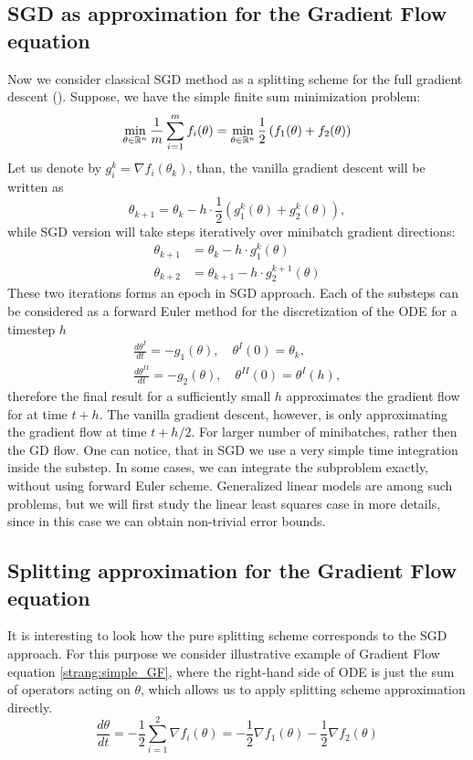 \documentclass{article} %
\begin{document}
\subsection{SGD as approximation for the Gradient Flow equation}
Now we consider classical SGD method as a splitting scheme for the full gradient descent (\cite{cauchy1847methode}). Suppose, we have the simple finite sum minimization problem:
$$
\min_{\theta \in {\mathbb{R}}^n} \dfrac{1}{m}\sum\limits_{i=1}^m f_i(\theta) = \min_{\theta \in {\mathbb{R}}^n} \frac{1}{2} \left( f_1(\theta) + f_2(\theta)\right)
$$
Let us denote by $g_i^k = \nabla f_i(\theta_k)$, than, the vanilla gradient descent will be written as
$$
\theta_{k+1} = \theta_k - h\cdot\frac{1}{2} \left( g^k_1(\theta) + g^k_2(\theta)\right),
$$
while SGD version will take steps iteratively over minibatch gradient directions:
\begin{align*}\label{strang:sgd2}
\theta_{k+1} &= \theta_k - h\cdot g^k_1(\theta) \\
\theta_{k+2} &= \theta_{k+1} - h\cdot  g^{k+1}_2(\theta)
\end{align*}
These two iterations forms an epoch in SGD approach. Each of the substeps can be considered as a forward Euler method for the discretization of the ODE for a timestep $h$
\begin{align*}
    \frac{d \theta^I}{d t} = -g_1(\theta), \quad \theta^I(0) = \theta_{k},\\
    \frac{d \theta^{II}}{d t} = -g_2(\theta), \quad \theta^{II}(0) = \theta^{I}(h),
\end{align*}
therefore the final result for a sufficiently small $h$ approximates the gradient flow for at time $t + h$. The vanilla gradient descent, however, is only approximating the gradient flow at time $t + h/2$. For larger number of minibatches, rather then the GD flow. One can notice, that in SGD we use a very simple time integration inside the substep. In some cases, we can integrate the subproblem exactly, without using forward Euler scheme. Generalized linear models are among such problems, but we will first study the linear least squares case in more details, since in this case we can obtain non-trivial error bounds.

\subsection{Splitting approximation for the Gradient Flow equation}

It is interesting to look how the pure splitting scheme corresponds to the SGD approach. For this purpose we consider illustrative example of Gradient Flow equation \ref{strang:simple_GF}, where the right-hand side of ODE is just the sum of operators acting on $\theta$, which allows us to apply splitting scheme approximation directly.
\begin{equation}
\label{strang:simple_GF}
\dfrac{d \theta}{d t} = -\dfrac{1}{2} \sum\limits_{i=1}^2 \nabla f_i (\theta) = - \dfrac{1}{2} \nabla f_1 (\theta) -\dfrac{1}{2}  \nabla f_2 (\theta)
\end{equation}
\end{document}
